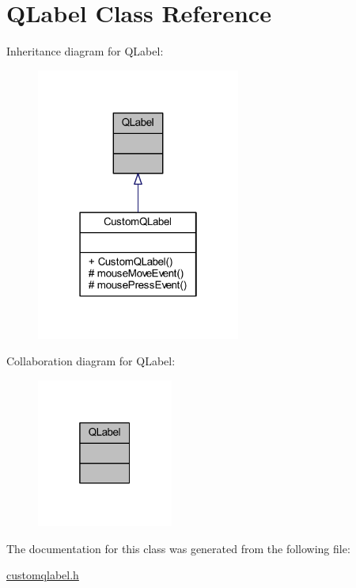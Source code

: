 \hypertarget{classQLabel}{}\section{Q\+Label Class Reference}
\label{classQLabel}


Inheritance diagram for Q\+Label\+:
\nopagebreak
\begin{figure}[H]
\begin{center}
\leavevmode
\includegraphics[width=190pt]{classQLabel__inherit__graph}
\end{center}
\end{figure}


Collaboration diagram for Q\+Label\+:
\nopagebreak
\begin{figure}[H]
\begin{center}
\leavevmode
\includegraphics[width=127pt]{classQLabel__coll__graph}
\end{center}
\end{figure}


The documentation for this class was generated from the following file\+:\begin{DoxyCompactItemize}
\item 
\mbox{\hyperlink{customqlabel_8h}{customqlabel.\+h}}\end{DoxyCompactItemize}
